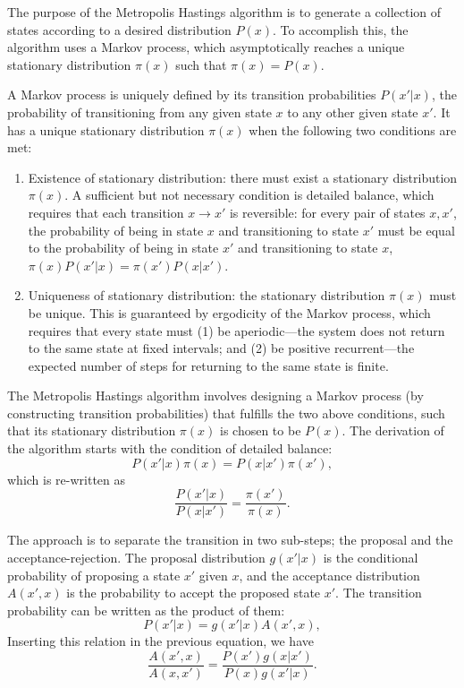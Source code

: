 The purpose of the Metropolis Hastings algorithm is to generate a collection of states according to a desired distribution \(P(x)\). To accomplish this, the algorithm uses a Markov process, which asymptotically reaches a unique stationary distribution \( \pi(x) \) such that \( \pi(x) = P(x) \). 

A Markov process is uniquely defined by its transition probabilities \( P(x' | x) \), the probability of transitioning from any given state \( x \) to any other given state \( x' \). It has a unique stationary distribution \( \pi(x) \) when the following two conditions are met:
\begin{enumerate}
    \item Existence of stationary distribution: there must exist a stationary distribution \( \pi(x) \). A sufficient but not necessary condition is detailed balance, which requires that each transition \( x \rightarrow x' \) is reversible: for every pair of states \( x, x' \), the probability of being in state \( x \) and transitioning to state \( x' \) must be equal to the probability of being in state \( x' \) and transitioning to state \( x \), \( \pi(x)P(x' | x) = \pi(x')P(x | x') \).
    \item Uniqueness of stationary distribution: the stationary distribution \( \pi(x) \) must be unique. This is guaranteed by ergodicity of the Markov process, which requires that every state must (1) be aperiodic---the system does not return to the same state at fixed intervals; and (2) be positive recurrent---the expected number of steps for returning to the same state is finite.
\end{enumerate}

The Metropolis Hastings algorithm involves designing a Markov process (by constructing transition probabilities) that fulfills the two above conditions, such that its stationary distribution \( \pi(x) \) is chosen to be \( P(x) \). The derivation of the algorithm starts with the condition of detailed balance:
\[
P(x' | x) \pi(x) = P(x | x') \pi(x'),
\]
which is re-written as
\[
\frac{P(x' | x)}{P(x | x')} = \frac{\pi(x')}{\pi(x)}.
\]

The approach is to separate the transition in two sub-steps; the proposal and the acceptance-rejection. The proposal distribution \( g(x' | x) \) is the conditional probability of proposing a state \( x' \) given \( x \), and the acceptance distribution \( A(x', x) \) is the probability to accept the proposed state \( x' \). The transition probability can be written as the product of them:
\[
P(x' | x) = g(x' | x) A(x', x),
\]
Inserting this relation in the previous equation, we have
\[
\frac{A(x', x)}{A(x, x')} = \frac{P(x') g(x | x')}{P(x) g(x' | x)}.
\]

